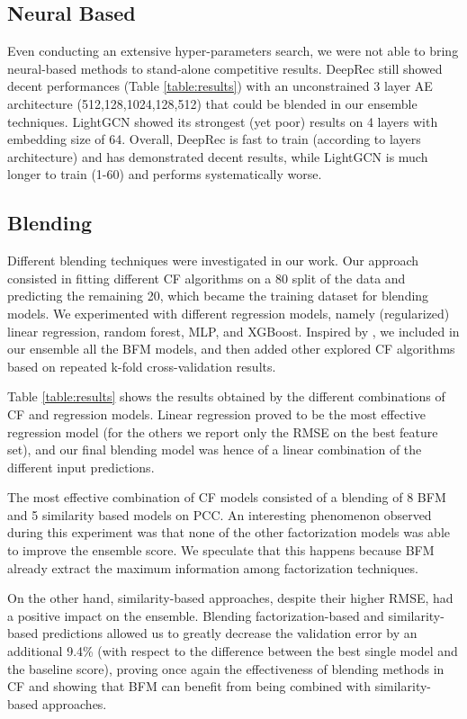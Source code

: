 \documentclass[sigconf]{acmart}
\begin{document}
\subsection{Neural Based}
Even conducting an extensive hyper-parameters search, we were not able to bring neural-based methods to stand-alone competitive results. DeepRec still showed decent performances (Table \ref{table:results}) with an unconstrained 3 layer AE architecture (512,128,1024,128,512) that could be blended in our ensemble techniques.
LightGCN showed its strongest (yet poor) results on 4 layers with embedding size of 64.
Overall, DeepRec is fast to train (according to layers architecture) and has demonstrated decent results, while LightGCN is much longer to train (1-60) and performs systematically worse. 

\subsection{Blending}
Different blending techniques were investigated in our work. Our approach consisted in fitting different CF algorithms on a 80 split of the data and predicting the remaining 20, which became the training dataset for blending models.
We experimented with different regression models, namely (regularized) linear regression, random forest, MLP, and XGBoost. 
Inspired by \cite{Freudenthaler_bayesianfactorization}, we included in our ensemble all the BFM models, and then added other explored CF algorithms based on repeated k-fold cross-validation results. 

Table \ref{table:results} shows the results obtained by the different combinations of CF and regression models. 
Linear regression proved to be the most effective regression model (for the others we report only the RMSE on the best feature set), and our final blending model was hence of a linear combination of the different input predictions.

The most effective combination of CF models consisted of a  blending of 8 BFM and 5 similarity based models on PCC. 
An interesting phenomenon observed during this experiment was that none of the other factorization models was able to improve the ensemble score. We speculate that this happens because BFM already extract the maximum information among factorization techniques. 

On the other hand, similarity-based approaches, despite their higher RMSE, had a positive impact on the ensemble.
Blending factorization-based and similarity-based predictions allowed us to greatly decrease the validation error by an additional 9.4\% (with respect to the difference between the best single model and the baseline score), proving once again the effectiveness of blending methods in CF and showing that BFM can benefit from being combined with similarity-based approaches.
\end{document}
